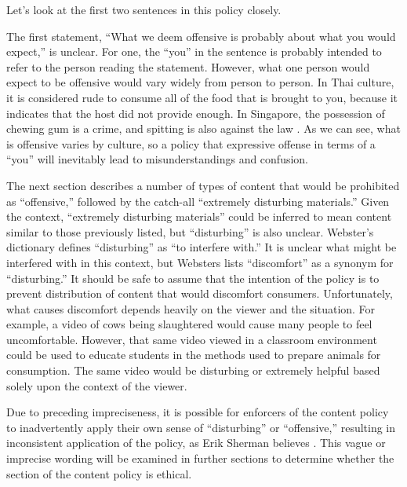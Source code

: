 \documentclass[11pt]{article}
\begin{document}
\begin{multicols}{2}
\begin{description}
\end{description}

Let's look at the first two sentences in this policy closely.

The first statement, ``What we deem offensive is probably about what you would expect,'' is unclear.  For one, the ``you'' in the sentence is probably intended to refer to the person reading the statement.  However, what one person would expect to be offensive would vary widely from person to person.  In Thai culture, it is considered rude to consume all of the food that is brought to you, because it indicates that the host did not provide enough. \cite{EHowThai}  In Singapore, the possession of chewing gum is a crime, and spitting is also against the law \cite{HotelTravelSingapore}.  As we can see, what is offensive varies by culture, so a policy that expressive offense in terms of a ``you'' will inevitably lead to misunderstandings and confusion.

The next section describes a number of types of content that would be prohibited as ``offensive,'' followed by the catch-all ``extremely disturbing materials.'' Given the context, ``extremely disturbing materials'' could be inferred to mean content similar to those previously listed, but ``disturbing'' is also unclear.  Webster's dictionary defines ``disturbing'' as ``to interfere with.'' \cite{WebsterOnlineDict}  It is unclear what might be interfered with in this context, but Websters lists ``discomfort'' as a synonym for ``disturbing.'' \cite{WebsterOnlineDict}  It should be safe to assume that the intention of the policy is to prevent distribution of content that would discomfort consumers.  Unfortunately, what causes discomfort depends heavily on the viewer and the situation.  For example, a video of cows being slaughtered would cause many people to feel uncomfortable.  However, that same video viewed in a classroom environment could be used to educate students in the methods used to prepare animals for consumption.  The same video would be disturbing or extremely helpful based solely upon the context of the viewer. 

Due to preceding impreciseness, it is possible for enforcers of the content policy to inadvertently apply their own sense of ``disturbing'' or ``offensive,'' resulting in inconsistent application of the policy, as Erik Sherman believes \cite{ShermanAmazonExecs}.  This vague or imprecise wording will be examined in further sections to determine whether the section of the content policy is ethical.


\end{multicols}
\end{document}
